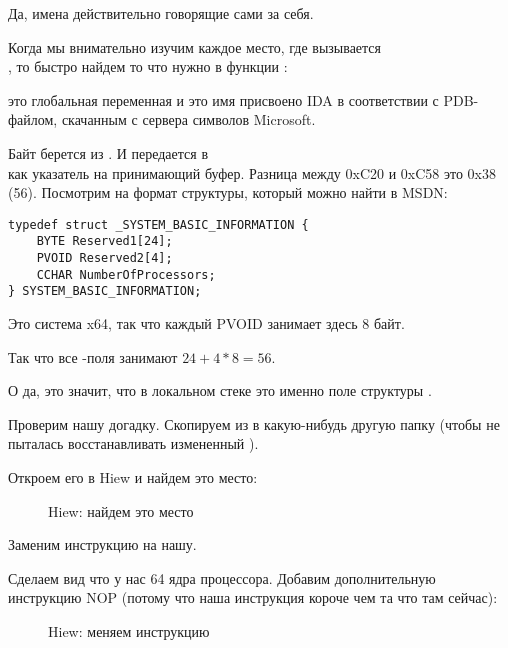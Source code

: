 Да, имена действительно говорящие сами за себя.

Когда мы внимательно изучим каждое место, где вызывается\\
,
то быстро найдем то что нужно в функции :%



 это глобальная переменная и это имя присвоено IDA в соответствии с \gls{PDB}-файлом,
скачанным с сервера символов Microsoft.

Байт берется из . 
И  передается в\\
как указатель на принимающий буфер.
Разница между 0xC20 и 0xC58 это 0x38 (56).
Посмотрим на формат структуры, который можно найти в MSDN:

\begin{lstlisting}[style=customc]
typedef struct _SYSTEM_BASIC_INFORMATION {
    BYTE Reserved1[24];
    PVOID Reserved2[4];
    CCHAR NumberOfProcessors;
} SYSTEM_BASIC_INFORMATION;
\end{lstlisting}

Это система x64, так что каждый PVOID занимает здесь 8 байт.

Так что все -поля занимают $24+4*8=56$.

О да, это значит, что  в локальном стеке это именно поле
 структуры .

Проверим нашу догадку.
Скопируем  из  
в какую-нибудь другую папку 
(чтобы  не пыталась восстанавливать измененный ).

Откроем его в Hiew и найдем это место:

\begin{figure}[H]
\centering
{}
\caption{Hiew: найдем это место}
\end{figure}

Заменим инструкцию  на нашу.

Сделаем вид что у нас 64 ядра процессора.
Добавим дополнительную инструкцию \ac{NOP} (потому что наша инструкция короче чем та что там сейчас):

\begin{figure}[H]
\centering
{}
\caption{Hiew: меняем инструкцию}
\end{figure}

